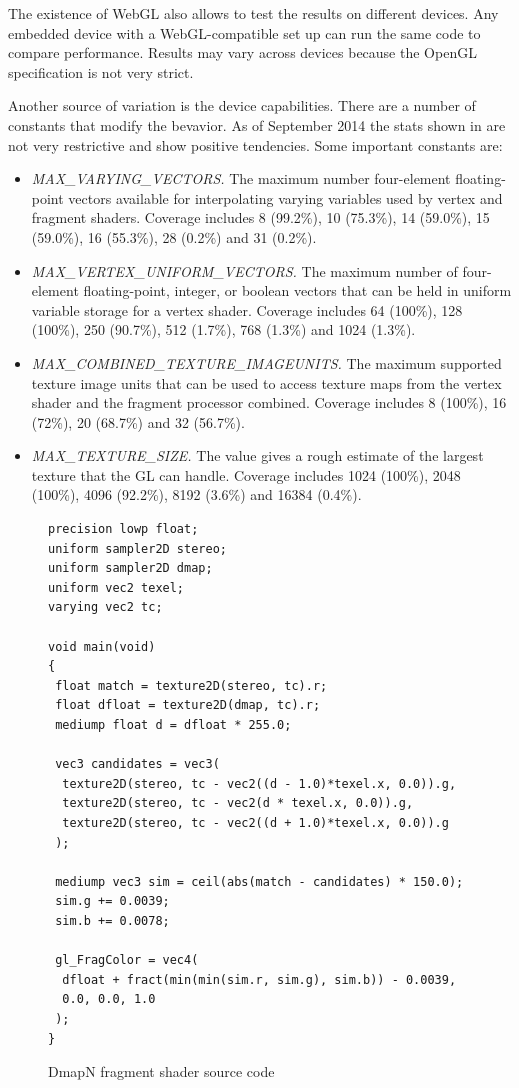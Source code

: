 \documentclass[conference]{IEEEtran}
\begin{document}
The existence of WebGL also allows to test the results on different devices. Any embedded device with a WebGL-compatible set up can run the same code to compare performance. Results may vary across devices because the OpenGL specification is not very strict.

Another source of variation is the device capabilities. There are a number of constants that modify the bevavior. As of September 2014 the stats shown in \cite{singhal12} are not very restrictive and show positive tendencies. Some important constants are:
\begin{itemize}
\item \emph{MAX\_VARYING\_VECTORS.} The maximum number four-element floating-point vectors available for interpolating varying variables used by vertex and fragment shaders. Coverage includes 8 (99.2\%), 10 (75.3\%), 14 (59.0\%), 15 (59.0\%), 16 (55.3\%), 28 (0.2\%) and 31 (0.2\%).

\item \emph{MAX\_VERTEX\_UNIFORM\_VECTORS.} The maximum number of four-element floating-point, integer, or boolean vectors that can be held in uniform variable storage for a vertex shader. Coverage includes 64 (100\%), 128 (100\%), 250 (90.7\%), 512 (1.7\%), 768 (1.3\%) and 1024 (1.3\%).

\item \emph{MAX\_COMBINED\_TEXTURE\_IMAGEUNITS.} The maximum supported texture image units that can be used to access texture maps from the vertex shader and the fragment processor combined. Coverage includes 8 (100\%), 16 (72\%), 20 (68.7\%) and 32 (56.7\%).

\item \emph{MAX\_TEXTURE\_SIZE.} The value gives a rough estimate of the largest texture that the GL can handle. Coverage includes 1024 (100\%), 2048 (100\%), 4096 (92.2\%), 8192 (3.6\%) and 16384 (0.4\%).
\end{itemize}

\begin{figure}[!t]
	\begin{Verbatim}[frame=single,fontsize=\scriptsize]
precision lowp float;
uniform sampler2D stereo;
uniform sampler2D dmap;
uniform vec2 texel;
varying vec2 tc;

void main(void)
{
 float match = texture2D(stereo, tc).r;
 float dfloat = texture2D(dmap, tc).r;
 mediump float d = dfloat * 255.0;

 vec3 candidates = vec3(
  texture2D(stereo, tc - vec2((d - 1.0)*texel.x, 0.0)).g,
  texture2D(stereo, tc - vec2(d * texel.x, 0.0)).g,
  texture2D(stereo, tc - vec2((d + 1.0)*texel.x, 0.0)).g
 );

 mediump vec3 sim = ceil(abs(match - candidates) * 150.0);
 sim.g += 0.0039;
 sim.b += 0.0078;

 gl_FragColor = vec4(
  dfloat + fract(min(min(sim.r, sim.g), sim.b)) - 0.0039,
  0.0, 0.0, 1.0
 );
}
	\end{Verbatim}
	\caption{DmapN fragment shader source code}
	\label{fig:fs_dmapN}
\end{figure}
\end{document}
